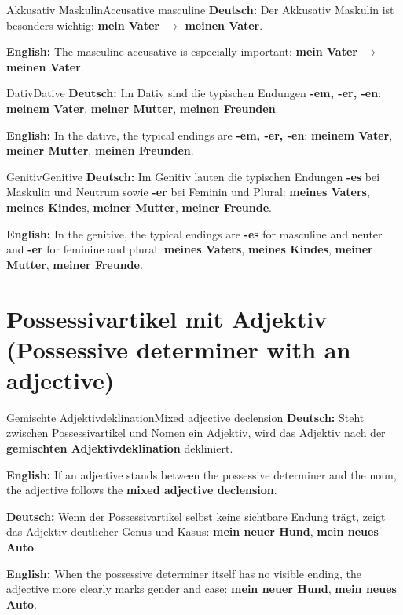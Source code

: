 \documentclass[a4paper,11pt]{article}
\newcommand{\GermanText}[1]{\textbf{Deutsch: }#1\par}
\newcommand{\EnglishText}[1]{{\small\color{SoftGray}\textbf{English: }#1\par}}
\begin{document}
\begin{grammarentry}{Akkusativ Maskulin}{Accusative masculine}
\GermanText{Der Akkusativ Maskulin ist besonders wichtig: \textbf{mein Vater $\rightarrow$ meinen Vater}.}
\EnglishText{The masculine accusative is especially important: \textbf{mein Vater $\rightarrow$ meinen Vater}.}
\end{grammarentry}

\begin{grammarentry}{Dativ}{Dative}
\GermanText{Im Dativ sind die typischen Endungen \textbf{-em, -er, -en}: \textbf{meinem Vater}, \textbf{meiner Mutter}, \textbf{meinen Freunden}.}
\EnglishText{In the dative, the typical endings are \textbf{-em, -er, -en}: \textbf{meinem Vater}, \textbf{meiner Mutter}, \textbf{meinen Freunden}.}
\end{grammarentry}

\begin{grammarentry}{Genitiv}{Genitive}
\GermanText{Im Genitiv lauten die typischen Endungen \textbf{-es} bei Maskulin und Neutrum sowie \textbf{-er} bei Feminin und Plural: \textbf{meines Vaters}, \textbf{meines Kindes}, \textbf{meiner Mutter}, \textbf{meiner Freunde}.}
\EnglishText{In the genitive, the typical endings are \textbf{-es} for masculine and neuter and \textbf{-er} for feminine and plural: \textbf{meines Vaters}, \textbf{meines Kindes}, \textbf{meiner Mutter}, \textbf{meiner Freunde}.}
\end{grammarentry}

\section{Possessivartikel mit Adjektiv \textnormal{(Possessive determiner with an adjective)}}

\begin{grammarentry}{Gemischte Adjektivdeklination}{Mixed adjective declension}
\GermanText{Steht zwischen Possessivartikel und Nomen ein Adjektiv, wird das Adjektiv nach der \textbf{gemischten Adjektivdeklination} dekliniert.}
\EnglishText{If an adjective stands between the possessive determiner and the noun, the adjective follows the \textbf{mixed adjective declension}.}

\GermanText{Wenn der Possessivartikel selbst keine sichtbare Endung trägt, zeigt das Adjektiv deutlicher Genus und Kasus: \textbf{mein neuer Hund}, \textbf{mein neues Auto}.}
\EnglishText{When the possessive determiner itself has no visible ending, the adjective more clearly marks gender and case: \textbf{mein neuer Hund}, \textbf{mein neues Auto}.}
\end{grammarentry}
\end{document}

